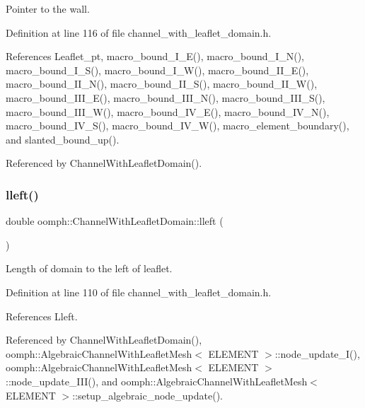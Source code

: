 Pointer to the wall. 



Definition at line 116 of file channel\+\_\+with\+\_\+leaflet\+\_\+domain.\+h.



References Leaflet\+\_\+pt, macro\+\_\+bound\+\_\+\+I\+\_\+\+E(), macro\+\_\+bound\+\_\+\+I\+\_\+\+N(), macro\+\_\+bound\+\_\+\+I\+\_\+\+S(), macro\+\_\+bound\+\_\+\+I\+\_\+\+W(), macro\+\_\+bound\+\_\+\+I\+I\+\_\+\+E(), macro\+\_\+bound\+\_\+\+I\+I\+\_\+\+N(), macro\+\_\+bound\+\_\+\+I\+I\+\_\+\+S(), macro\+\_\+bound\+\_\+\+I\+I\+\_\+\+W(), macro\+\_\+bound\+\_\+\+I\+I\+I\+\_\+\+E(), macro\+\_\+bound\+\_\+\+I\+I\+I\+\_\+\+N(), macro\+\_\+bound\+\_\+\+I\+I\+I\+\_\+\+S(), macro\+\_\+bound\+\_\+\+I\+I\+I\+\_\+\+W(), macro\+\_\+bound\+\_\+\+I\+V\+\_\+\+E(), macro\+\_\+bound\+\_\+\+I\+V\+\_\+\+N(), macro\+\_\+bound\+\_\+\+I\+V\+\_\+\+S(), macro\+\_\+bound\+\_\+\+I\+V\+\_\+\+W(), macro\+\_\+element\+\_\+boundary(), and slanted\+\_\+bound\+\_\+up().



Referenced by Channel\+With\+Leaflet\+Domain().

\mbox{\label{classoomph_1_1ChannelWithLeafletDomain_a5538092062970dbd2f02218a05639d49}} 
\subsubsection{\texorpdfstring{lleft()}{lleft()}}
{\footnotesize\ttfamily double oomph\+::\+Channel\+With\+Leaflet\+Domain\+::lleft (\begin{DoxyParamCaption}{ }\end{DoxyParamCaption})\hspace{0.3cm}{\ttfamily [inline]}}



Length of domain to the left of leaflet. 



Definition at line 110 of file channel\+\_\+with\+\_\+leaflet\+\_\+domain.\+h.



References Lleft.



Referenced by Channel\+With\+Leaflet\+Domain(), oomph\+::\+Algebraic\+Channel\+With\+Leaflet\+Mesh$<$ E\+L\+E\+M\+E\+N\+T $>$\+::node\+\_\+update\+\_\+\+I(), oomph\+::\+Algebraic\+Channel\+With\+Leaflet\+Mesh$<$ E\+L\+E\+M\+E\+N\+T $>$\+::node\+\_\+update\+\_\+\+I\+I\+I(), and oomph\+::\+Algebraic\+Channel\+With\+Leaflet\+Mesh$<$ E\+L\+E\+M\+E\+N\+T $>$\+::setup\+\_\+algebraic\+\_\+node\+\_\+update().


